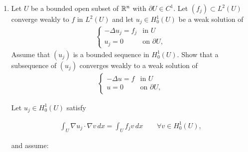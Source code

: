 \documentclass[12pt,a4paper]{report}
\begin{document}
\begin{enumerate}

If you'd like, I can explain , since without it uniqueness generally fails.



\newpage
\item Let $U$ be a bounded open subset of $\mathbb{R}^n$ with $\partial U \in C^1$.  Let $(f_j) \subset L^2(U)$ converge weakly to $f$ in $L^2(U)$ and let $u_j \in  H_0^1(U)$ be a weak solution of
\begin{align*}
	\left \{\begin{array}{rl}
		 -\Delta u_j=f_j & \text{in } U\\
		u_j = 0 & \text{on } \partial U,
	\end{array} \right .
\end{align*}
Assume that $(u_j)$ is a bounded sequence in $H_0^1(U)$.  Show that a subsequence of $(u_j)$ converges weakly to a weak solution of
\begin{align*}
	\left \{\begin{array}{rl}
		 -\Delta u=f & \text{in } U\\
		u = 0 & \text{on } \partial U,
	\end{array} \right .
\end{align*}

\HLINE

Let $u_j\in H_0^1(U)$ satisfy

\begin{align*}
\int_U \nabla u_j\cdot \nabla v\,dx=\int_U f_jv\,dx
\qquad\forall v\in H_0^1(U),
\end{align*}

and assume:


\end{enumerate}
\end{document}

